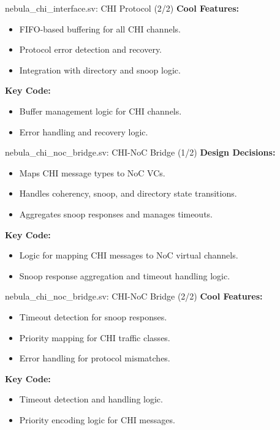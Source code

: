 \documentclass{beamer}
\begin{document}
\begin{frame}{nebula\_chi\_interface.sv: CHI Protocol (2/2)}
  \textbf{Cool Features:}
  \begin{itemize}
    \item FIFO-based buffering for all CHI channels.
    \item Protocol error detection and recovery.
    \item Integration with directory and snoop logic.
  \end{itemize}
  \textbf{Key Code:}
  \begin{itemize}
    \item Buffer management logic for CHI channels.
    \item Error handling and recovery logic.
  \end{itemize}
\end{frame}

\begin{frame}{nebula\_chi\_noc\_bridge.sv: CHI-NoC Bridge (1/2)}
  \textbf{Design Decisions:}
  \begin{itemize}
    \item Maps CHI message types to NoC VCs.
    \item Handles coherency, snoop, and directory state transitions.
    \item Aggregates snoop responses and manages timeouts.
  \end{itemize}
  \textbf{Key Code:}
  \begin{itemize}
    \item Logic for mapping CHI messages to NoC virtual channels.
    \item Snoop response aggregation and timeout handling logic.
  \end{itemize}
\end{frame}

\begin{frame}{nebula\_chi\_noc\_bridge.sv: CHI-NoC Bridge (2/2)}
  \textbf{Cool Features:}
  \begin{itemize}
    \item Timeout detection for snoop responses.
    \item Priority mapping for CHI traffic classes.
    \item Error handling for protocol mismatches.
  \end{itemize}
  \textbf{Key Code:}
  \begin{itemize}
    \item Timeout detection and handling logic.
    \item Priority encoding logic for CHI messages.
  \end{itemize}
\end{frame}
\end{document}
